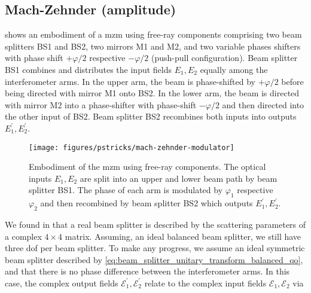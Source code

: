 \FloatBarrier
\subsection{Mach-Zehnder (amplitude)}

 shows an embodiment of a \gls{mzm} using free-ray components comprising two beam splitters BS1 and BS2, two mirrors M1 and M2, and two variable phases shifters with phase shift $+\varphi/2$ respective $-\varphi/2$ (push-pull configuration).
Beam splitter BS1 combines and distributes the input fields $E_1,E_2$ equally among the interferometer arms.
In the upper arm, the beam is phase-shifted by $+\varphi/2$ before being directed with mirror M1 onto BS2.
In the lower arm, the beam is directed with mirror M2 into a phase-shifter with phase-shift $-\varphi/2$ and then directed into the other input of BS2.
Beam splitter BS2 recombines both inputs into outputs $E_1^\prime,E_2^\prime$.
\begin{figure}[htb]
    \centering
    \texttt{[image: figures/pstricks/mach-zehnder-modulator]}
    \caption{Embodiment of the \gls{mzm} using free-ray components. The optical inputs $E_1,E_2$ are split into an upper and lower beam path by beam splitter BS1. The phase of each arm is modulated by $\varphi_1$ respective $\varphi_2$ and then recombined by beam splitter BS2 which outputs $E_1^\prime,E_2^\prime$.}\label{fig:mach_zehnder_modulator}
\end{figure}
We found in  that a real beam splitter is described by the scattering parameters of a complex $4\times 4$ matrix.
Assuming, an ideal balanced beam splitter, we still have three \gls{dof} per beam splitter.
To make any progress, we assume an ideal symmetric beam splitter described by \cref{eq:beam_splitter_unitary_transform_balanced_qo}, and that there is no phase difference between the interferometer arms.
In this case, the complex output fields $\mathcal{E}_1^\prime,\mathcal{E}_2^\prime$ relate to the complex input fields $\mathcal{E}_1,\mathcal{E}_2$ via
